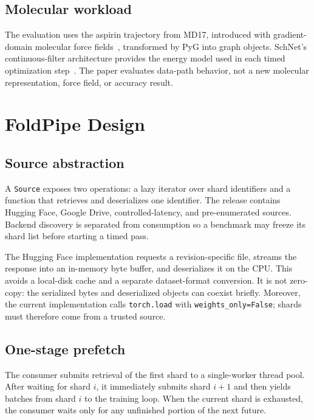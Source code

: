 \documentclass[10pt]{article}
\begin{document}
\subsection{Molecular workload}

The evaluation uses the aspirin trajectory from MD17, introduced with
gradient-domain molecular force fields~\cite{chmiela2017md17}, transformed by
PyG into graph objects.  SchNet's continuous-filter architecture provides the
energy model used in each timed optimization step~\cite{schutt2018schnet}.  The
paper evaluates data-path behavior, not a new molecular representation, force
field, or accuracy result.

\section{FoldPipe Design}

\subsection{Source abstraction}

A \texttt{Source} exposes two operations: a lazy iterator over shard
identifiers and a function that retrieves and deserializes one identifier.
The release contains Hugging Face, Google Drive, controlled-latency, and
pre-enumerated sources.  Backend discovery is separated from consumption so a
benchmark may freeze its shard list before starting a timed pass.

The Hugging Face implementation requests a revision-specific file, streams the
response into an in-memory byte buffer, and deserializes it on the CPU.  This
avoids a local-disk cache and a separate dataset-format conversion.  It is not
zero-copy: the serialized bytes and deserialized objects can coexist briefly.
Moreover, the current implementation calls \texttt{torch.load} with
\texttt{weights\_only=False}; shards must therefore come from a trusted source.

\subsection{One-stage prefetch}

The consumer submits retrieval of the first shard to a single-worker thread
pool.  After waiting for shard $i$, it immediately submits shard $i+1$ and then
yields batches from shard $i$ to the training loop.  When the current shard is
exhausted, the consumer waits only for any unfinished portion of the next
future.
\end{document}
